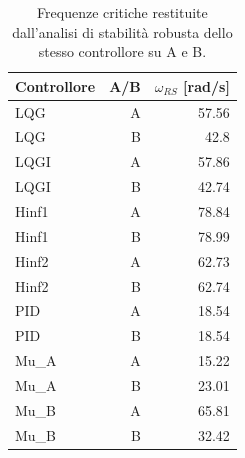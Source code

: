 \begin{table}[htbp]\centering\small
\setlength{\tabcolsep}{4pt}
\begin{tabular}{lrr}\toprule
Controllore & A/B & $\omega_{RS}$ [rad/s]\\\midrule
LQG & A & \num{57.56}\\
LQG & B & \num{42.8}\\
LQGI & A & \num{57.86}\\
LQGI & B & \num{42.74}\\
Hinf1 & A & \num{78.84}\\
Hinf1 & B & \num{78.99}\\
Hinf2 & A & \num{62.73}\\
Hinf2 & B & \num{62.74}\\
PID & A & \num{18.54}\\
PID & B & \num{18.54}\\
Mu\_A & A & \num{15.22}\\
Mu\_A & B & \num{23.01}\\
Mu\_B & A & \num{65.81}\\
Mu\_B & B & \num{32.42}\\
\bottomrule\end{tabular}
\caption{Frequenze critiche restituite dall'analisi di stabilità robusta dello stesso controllore su A e B.}
\end{table}
